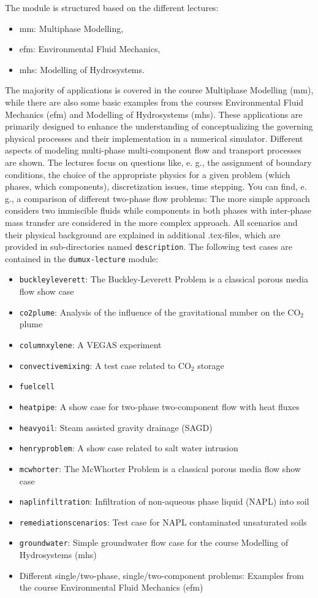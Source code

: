 The module is structured based on the different lectures:
\begin{itemize}
\item mm: Multiphase Modelling,
\item efm: Environmental Fluid Mechanics,
\item mhs: Modelling of Hydrosystems.
\end{itemize}
The majority of applications is covered in the course Multiphase Modelling (mm),
while there are also some basic examples from the
courses Environmental Fluid Mechanics (efm) and Modelling of Hydrosystems (mhs).
These applications are primarily designed to enhance the understanding of conceptualizing the
governing physical processes and their implementation in a numerical simulator.
Different aspects of modeling multi-phase multi-component flow and transport processes are shown.
The lectures focus on questions like, e. g., the assignment of boundary conditions, the choice of the
appropriate physics for a given problem (which phases, which components), discretization issues,
time stepping. You can find, e. g., a comparison of different two-phase flow problems: The
more simple approach considers two immiscible fluids while components in both phases with inter-phase
mass transfer are considered in the more complex approach.
All scenarios and their physical background are explained in additional .tex-files,
which are provided in sub-directories named \texttt{description}. The following test cases are
contained in the \texttt{dumux-lecture} module:
\begin{itemize}
\item \texttt{buckleyleverett}: The Buckley-Leverett Problem is a classical porous media flow show case
\item \texttt{co2plume}: Analysis of the influence of the gravitational number on the $\text{CO}_2$ plume
\item \texttt{columnxylene}: A VEGAS experiment
\item \texttt{convectivemixing}: A test case related to CO$_2$ storage
\item \texttt{fuelcell}%
\item \texttt{heatpipe}: A show case for two-phase two-component flow with heat fluxes
\item \texttt{heavyoil}: Steam assisted gravity drainage (SAGD)
\item \texttt{henryproblem}: A show case related to salt water intrusion
\item \texttt{mcwhorter}: The McWhorter Problem is a classical porous media flow show case
\item \texttt{naplinfiltration}: Infiltration of non-aqueous phase liquid (NAPL) into soil
\item \texttt{remediationscenarios}: Test case for NAPL contaminated unsaturated soils
\item \texttt{groundwater}: Simple groundwater flow case for the course Modelling of Hydrosystems (mhs)
\item Different single/two-phase, single/two-component problems: Examples from the course Environmental Fluid Mechanics (efm)
\end{itemize}
